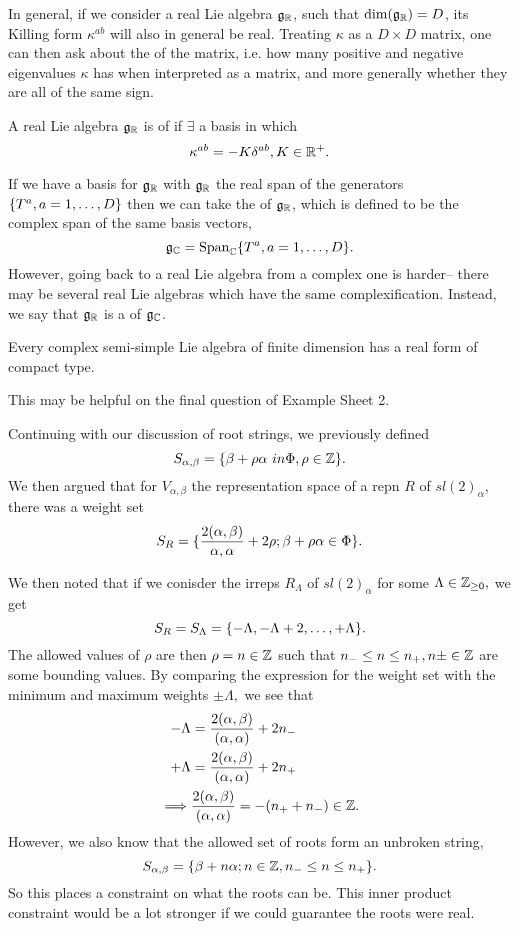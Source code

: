 In general, if we consider a real Lie algebra $\mathfrak{g}_{\mathbb{R}}$, such that $\dim(\mathfrak{g}_{\mathbb{R}})=D$, its Killing form $\kappa^{ab}$ will also in general be real. Treating $\kappa$ as a $D\times D$ matrix, one can then ask about the  of the matrix, i.e. how many positive and negative eigenvalues $\kappa$ has when interpreted as a matrix, and more generally whether they are all of the same sign.
\begin{defn}
A real Lie algebra $\mathfrak{g}_{\mathbb{R}}$ is of  if $\exists$ a basis in which
$$\kappa^{ab}=-K \delta^{ab}, K\in \mathbb{R}^+.$$
\end{defn}
If we have a basis for $\mathfrak{g}_{\mathbb{R}}$ with $\mathfrak{g}_{\mathbb{R}}$ the real span of the generators $\{T^a,a=1,\ldots,D\}$ then we can take the  of $\mathfrak{g}_{\mathbb{R}}$, which is defined to be the complex span of the same basis vectors,
$$\mathfrak{g}_{\mathbb{C}} = \text{Span}_{\mathbb{C}} \{T^a,a=1,\ldots,D\}.$$
However, going back to a real Lie algebra from a complex one is harder-- there may be several real Lie algebras which have the same complexification. Instead, we say that $\mathfrak{g}_{\mathbb{R}}$ is a  of $\mathfrak{g}_{\mathbb{C}}$.

\begin{thm}
Every complex semi-simple Lie algebra of finite dimension has a real form of compact type.
\end{thm}
This may be helpful on the final question of Example Sheet 2.


Continuing with our discussion of root strings, we previously defined
$$S_{\alpha,\beta}=\{\beta+\rho \alpha\ in \Phi,\rho\in \mathbb{Z}\}.$$
We then argued that for $V_{\alpha,\beta}$ the representation space of a repn $R$ of $sl(2)_\alpha$, there was a weight set
$$S_R=\{\frac{2(\alpha,\beta)}{\alpha,\alpha}+2\rho; \beta+\rho\alpha \in \Phi\}.$$

We then noted that if we conisder the irreps $R_\Lambda$ of $sl(2)_\alpha$ for some $\Lambda\in \mathbb{Z}_{\geq 0},$ we get
$$S_R=S_\Lambda=\{-\Lambda,-\Lambda+2,\ldots,+\Lambda\}.$$
The allowed values of $\rho$ are then $\rho=n\in \mathbb{Z}$ such that $n_-\leq n \leq n_+, n\pm \in \mathbb{Z}$ are some bounding values. By comparing the expression for the weight set with the minimum and maximum weights $\pm \Lambda,$ we see that
\begin{align*}
    -\Lambda&= \frac{2(\alpha,\beta)}{(\alpha,\alpha)}+2n_-\\
    +\Lambda &=\frac{2(\alpha,\beta)}{(\alpha,\alpha)}+2n_+\\
    \implies&\frac{2(\alpha,\beta)}{(\alpha,\alpha)}=-(n_+ + n_-)\in \mathbb{Z}.
\end{align*}
However, we also know that the allowed set of roots form an unbroken string,
$$S_{\alpha,\beta}=\{\beta+n\alpha; n\in \mathbb{Z}, n_- \leq n \leq n_+\}.$$
So this places a constraint on what the roots can be. This inner product constraint would be a lot stronger if we could guarantee the roots were real.


